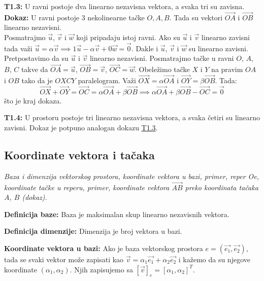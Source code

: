 \documentclass[12pt]{article}
\newcommand{\vek}[1]{\overrightarrow{#1}}
\begin{document}
\textbf{T1.3:}\label{theorem:1.3} U ravni postoje dva linearno nezavisna
vektora, a svaka tri su zavisna.\\
\textbf{Dokaz:} U ravni postoje 3 nekolinearne tačke $O, A, B$. Tada su vektori
$\vek{OA}$ i $\vek{OB}$ linearno nezavisni.\\
Posmatrajmo $\vek{u}$, $\vek{v}$ i $\vek{w}$ koji pripadaju istoj ravni. Ako su
$\vek{u}$ i $\vek{v}$ linearno zavisni tada važi $\vek{u}=\alpha\vek{v}
    \implies 1\vek{u}-\alpha\vek{v}+0\vek{w}=\vek{0}$. Dakle i
$\vek{u}$, $\vek{v}$ i $\vek{w}$ su linearno zavisni.\\
Pretpostavimo da su $\vek{u}$ i $\vek{v}$ linearno nezavisni. Posmatrajmo tačke
u ravni $O$, $A$, $B$, $C$ takve da $\vek{OA}=\vek{u}$, $\vek{OB}=\vek{v}$,
$\vek{OC}=\vek{w}$. Obeležimo tačke $X$ i $Y$ na pravim $OA$ i $OB$ tako da je
$OXCY$ paralelogram. Važi $\vek{OX}=\alpha\vek{OA}$ i $\vek{OY}=\beta
    \vek{OB}$. Tada:
$$\vek{OX}+\vek{OY}=\vek{OC}=\alpha\vek{OA}+\beta\vek{OB} \implies
    \alpha\vek{OA}+\beta\vek{OB}-\vek{OC}=\vek{0}$$
što je kraj dokaza.
\par

\textbf{T1.4:} U prostoru postoje tri linearno nezavisna vektora, a svaka četiri su
linearno zavisni. Dokaz je potpuno analogan dokazu \hyperref[theorem:1.3]{T1.3}.


\subsection{Koordinate vektora i tačaka}
\textit{Baza i dimenzija vektorskog prostora, koordinate vektora u bazi,
    primer, reper Oe, koordinate tačke u reperu, primer, koordinate vektora
    $\vek{AB}$ preko koordinata tačaka $A$, $B$ (dokaz).}
\par
\vspace*{1cm}

\textbf{Definicija baze:} Baza je maksimalan skup linearno nezavisnih vektora.
\par

\textbf{Definicija dimenzije:} Dimenzija je broj vektora u bazi.
\par

\textbf{Koordinate vektora u bazi:} Ako je baza vektorskog prostora
$e=(\vek{e_1}, \vek{e_2})$, tada se svaki vektor može zapisati kao
$\vek{v}=\alpha_1\vek{e_1}+\alpha_2\vek{e_2}$ i kažemo da su njegove
koordinate $(\alpha_1, \alpha_2)$. Njih zapisujemo sa
$[\vek{v}]_e=[\alpha_1, \alpha_2]^T$.
\par
\end{document}
